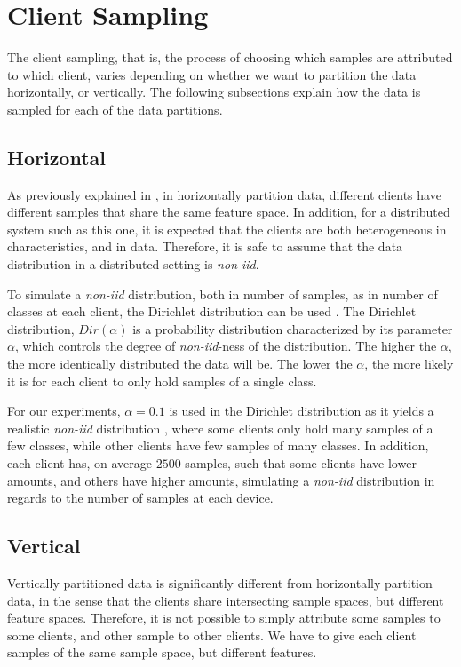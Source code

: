 \section{Client Sampling}

The client sampling, that is, the process of choosing which samples are attributed to which client, varies depending on whether we want to partition the data horizontally, or vertically. The following subsections explain how the data is sampled for each of the data partitions.

\subsection{Horizontal}

As previously explained in , in horizontally partition data, different clients have different samples that share the same feature space. In addition, for a distributed system such as this one, it is expected that the clients are both heterogeneous in characteristics, and in data. Therefore, it is safe to assume that the data distribution in a distributed setting is \textit{non-iid}.

To simulate a \textit{non-iid} distribution, both in number of samples, as in number of classes at each client, the Dirichlet distribution can be used \cite{tim, 10.48550/arxiv.2006.07242}. The Dirichlet distribution, $Dir(\alpha)$ is a probability distribution characterized by its parameter $\alpha$, which controls the degree of \textit{non-iid}-ness of the distribution. The higher the $\alpha$, the more identically distributed the data will be. The lower the $\alpha$, the more likely it is for each client to only hold samples of a single class.

For our experiments, $\alpha = 0.1$ is used in the Dirichlet distribution as it yields a realistic \textit{non-iid} distribution \cite{10.48550/arxiv.2006.07242}, where some clients only hold many samples of a few classes, while other clients have few samples of many classes. In addition, each client has, on average $2500$ samples, such that some clients have lower amounts, and others have higher amounts, simulating a \textit{non-iid} distribution in regards to the number of samples at each device.

\subsection{Vertical}

Vertically partitioned data is significantly different from horizontally partition data, in the sense that the clients share intersecting sample spaces, but different feature spaces. Therefore, it is not possible to simply attribute some samples to some clients, and other sample to other clients. We have to give each client samples of the same sample space, but different features.

